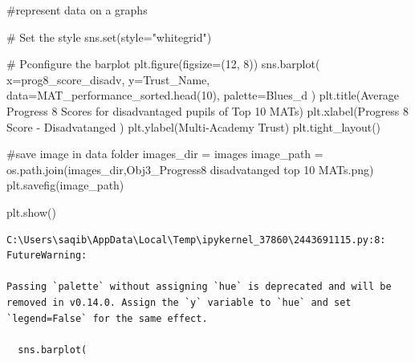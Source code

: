 \documentclass[
  letterpaper,
  DIV=11,
  numbers=noendperiod]{scrartcl}
\newenvironment{Shaded}{\begin{snugshade}}{\end{snugshade}}
\newcommand{\BuiltInTok}[1]{\textcolor[rgb]{0.00,0.23,0.31}{#1}}
\newcommand{\CommentTok}[1]{\textcolor[rgb]{0.37,0.37,0.37}{#1}}
\newcommand{\DecValTok}[1]{\textcolor[rgb]{0.68,0.00,0.00}{#1}}
\newcommand{\NormalTok}[1]{\textcolor[rgb]{0.00,0.23,0.31}{#1}}
\newcommand{\OperatorTok}[1]{\textcolor[rgb]{0.37,0.37,0.37}{#1}}
\newcommand{\StringTok}[1]{\textcolor[rgb]{0.13,0.47,0.30}{#1}}
\begin{document}
\begin{Shaded}
\begin{Highlighting}[]
\CommentTok{\#represent data on a graphs}

\CommentTok{\# Set the style }
\NormalTok{sns.}\BuiltInTok{set}\NormalTok{(style}\OperatorTok{=}\StringTok{"whitegrid"}\NormalTok{)}

\CommentTok{\# Pconfigure the barplot}
\NormalTok{plt.figure(figsize}\OperatorTok{=}\NormalTok{(}\DecValTok{12}\NormalTok{, }\DecValTok{8}\NormalTok{))}
\NormalTok{sns.barplot(}
\NormalTok{    x}\OperatorTok{=}\StringTok{\textquotesingle{}prog8\_score\_disadv\textquotesingle{}}\NormalTok{, }
\NormalTok{    y}\OperatorTok{=}\StringTok{\textquotesingle{}Trust\_Name\textquotesingle{}}\NormalTok{, }
\NormalTok{    data}\OperatorTok{=}\NormalTok{MAT\_performance\_sorted.head(}\DecValTok{10}\NormalTok{),}
\NormalTok{    palette}\OperatorTok{=}\StringTok{\textquotesingle{}Blues\_d\textquotesingle{}}
\NormalTok{)}
\NormalTok{plt.title(}\StringTok{\textquotesingle{}Average Progress 8 Scores for disadvantaged pupils of Top 10 MATs\textquotesingle{}}\NormalTok{)}
\NormalTok{plt.xlabel(}\StringTok{\textquotesingle{}Progress 8 Score {-} Disadvatanged \textquotesingle{}}\NormalTok{)}
\NormalTok{plt.ylabel(}\StringTok{\textquotesingle{}Multi{-}Academy Trust\textquotesingle{}}\NormalTok{)}
\NormalTok{plt.tight\_layout()}


\CommentTok{\#save image in data folder}
\NormalTok{images\_dir }\OperatorTok{=} \StringTok{\textquotesingle{}images\textquotesingle{}}
\NormalTok{image\_path }\OperatorTok{=}\NormalTok{ os.path.join(images\_dir,}\StringTok{\textquotesingle{}Obj3\_Progress8 disadvatanged top 10 MATs.png\textquotesingle{}}\NormalTok{)}
\NormalTok{plt.savefig(image\_path)}

\NormalTok{plt.show()}
\end{Highlighting}
\end{Shaded}

\begin{verbatim}
C:\Users\saqib\AppData\Local\Temp\ipykernel_37860\2443691115.py:8: FutureWarning: 

Passing `palette` without assigning `hue` is deprecated and will be removed in v0.14.0. Assign the `y` variable to `hue` and set `legend=False` for the same effect.

  sns.barplot(
\end{verbatim}
\end{document}
